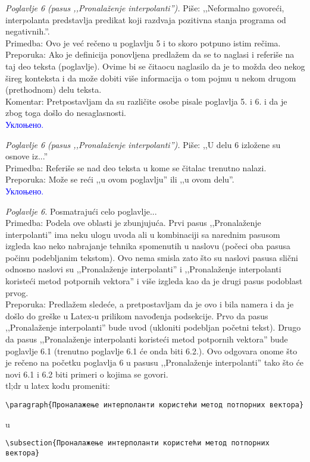 \documentclass[a4paper]{report}
\newcommand{\odgovor}[1]{\textcolor{blue}{#1}}
\begin{document}
\textit{Poglavlje 6 (pasus ,,Pronalaženje interpolanti'').} Piše: ,,Neformalno govoreći, interpolanta predstavlja predikat koji razdvaja pozitivna stanja programa od negativnih.''. \\
\indent Primedba: Ovo je već rečeno u poglavlju 5 i to skoro potpuno istim rečima. \\
\indent Preporuka: Ako je definicija ponovljena predlažem da se to naglasi i referiše na taj deo teksta (poglavlje). Ovime bi se čitaocu naglasilo da je to možda deo nekog šireg konteksta i da može dobiti više informacija o tom pojmu u nekom drugom (prethodnom) delu teksta. \\
\indent Komentar: Pretpostavljam da su različite osobe pisale poglavlja 5. i 6. i da je zbog toga došlo do nesaglasnosti. \\

\odgovor{Уклоњено.}

\textit{Poglavlje 6 (pasus ,,Pronalaženje interpolanti'').} Piše: ,,U delu 6 izložene su osnove iz...'' \\
\indent Primedba: Referiše se nad deo teksta u kome se čitalac trenutno nalazi. \\
\indent Preporuka: Može se reći ,,u ovom poglavlju'' ili ,,u ovom delu''. \\

\odgovor{Уклоњено.}

\textit{Poglavlje 6.} Posmatrajući celo poglavlje... \\
\indent Primedba: Podela ove oblasti je zbunjujuća. Prvi pasus ,,Pronalaženje interpolanti'' ima neku ulogu uvoda ali u
    kombinaciji sa narednim pasusom izgleda kao neko nabrajanje tehnika spomenutih u naslovu
    (počeci oba pasusa počinu podebljanim tekstom). Ovo nema smisla zato što su naslovi pasusa slični
    odnosno naslovi su ,,Pronalaženje interpolanti'' i  ,,Pronalaženje interpolanti koristeći metod
    potpornih vektora'' i više izgleda kao da je drugi pasus podoblast prvog. \\
\indent Preporuka: Predlažem sledeće, a pretpostavljam da je ovo i bila namera i da je došlo do greške u Latex-u prilikom navođenja podsekcije. Prvo da pasus ,,Pronalaženje interpolanti'' bude uvod (ukloniti podebljan početni tekst). Drugo da pasus ,,Pronalaženje interpolanti koristeći metod potpornih vektora'' bude poglavlje 6.1 (trenutno poglavlje 6.1 će onda biti 6.2.). Ovo odgovara onome što je rečeno na početku poglavlja 6 u pasusu ,,Pronalaženje interpolanti'' tako što će novi 6.1 i 6.2 biti primeri o kojima se govori. \\
tl;dr u latex kodu promeniti:
\begin{verbatim}
\paragraph{Проналажење интерполанти користећи метод потпорних вектора}
\end{verbatim}
u
\begin{verbatim}
\subsection{Проналажење интерполанти користећи метод потпорних вектора}
\end{verbatim}
\end{document}
